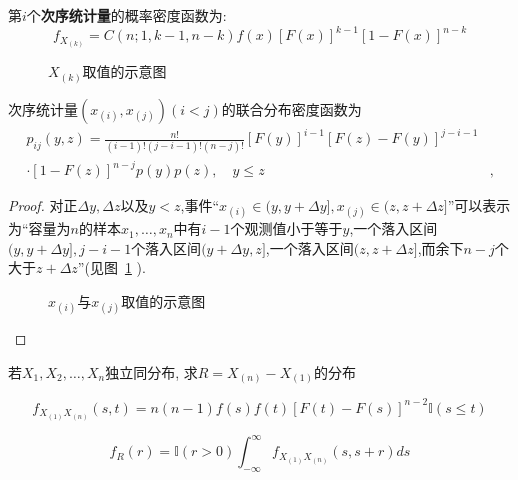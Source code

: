 \begin{theorem}
    第$i$个\textbf{次序统计量}的概率密度函数为:
    \[ f_{X_{(k)}} = C(n;1,k-1,n-k)f(x)[F(x)]^{k-1}[1-F(x)]^{n-k}  \]
\end{theorem}

\begin{figure}[!ht]
    \centering
    \caption{$X_{(k)}$取值的示意图}
\end{figure}

\begin{theorem}
    次序统计量$(x_{(i)},x_{(j)})(i<j)$的联合分布密度函数为
    \begin{align*}
        p_{ij}(y,z)=\frac{n!}{(i-1)!(j-i-1)!(n-j)!}[F(y)]^{i-1}[F(z)-F(y)]^{j-i-1} &   \\
        \cdot[1-F(z)]^{n-j}p(y)p(z),\quad y\leq z                                  & ,
    \end{align*}
\end{theorem}

\begin{proof}
    对正$\Delta y,\Delta z$以及$y<z$,事件``$x_{(i)}\in(y,y+\Delta y],x_{(j)}\in(z,z+\Delta z]$''可以表示为``容量为$n$的样本$x_1,\dotsc,x_n$中有$i-1$个观测值小于等于$y$,一个落入区间$(y,y+\Delta y],j-i-1$个落入区间$(y+\Delta y,z]$,一个落入区间$(z,z+\Delta z]$,而余下$n-j$个大于$z+\Delta z$''(见图~\ref{fig:5.3.6} ).
    \begin{figure}[!ht]
        \centering
        \caption{$x_{(i)}$与$x_{(j)}$取值的示意图}\label{fig:5.3.6}
    \end{figure}
\end{proof}
\begin{example}
    若$X_1,X_2,\dotsc,X_n$独立同分布, 求$R=X_{(n)}-X_{(1)}$的分布
\end{example}

\begin{solution}
    \[ f_{X_{(1)}X_{(n)}}(s,t)=n(n-1)f(s)f(t)[F(t)-F(s)]^{n-2}\mathbb{I}(s\le t) \]

    \[ f_R(r)=\mathbb{I}(r>0)\int_{-\infty}^{\infty}f_{X_{(1)}X_{(n)}}(s,s+r)ds \]

\end{solution}